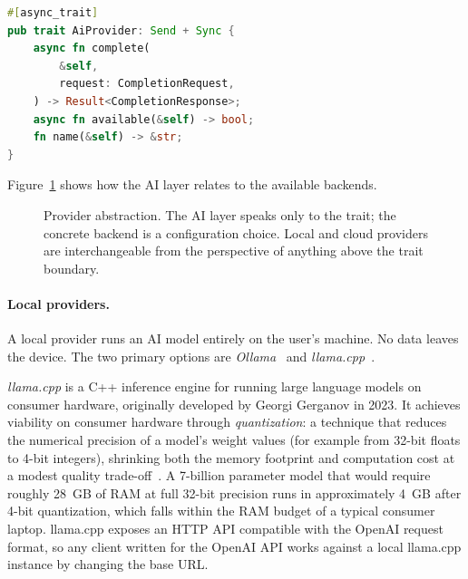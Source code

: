 \begin{lstlisting}[language=Rust, caption={AI provider trait}]
#[async_trait]
pub trait AiProvider: Send + Sync {
    async fn complete(
        &self,
        request: CompletionRequest,
    ) -> Result<CompletionResponse>;
    async fn available(&self) -> bool;
    fn name(&self) -> &str;
}
\end{lstlisting}

Figure~\ref{fig:providers} shows how the AI layer relates to the available
backends.

\begin{figure}[htbp]
\centering
{}
\caption{Provider abstraction. The AI layer speaks only to the trait; the
concrete backend is a configuration choice. Local and cloud providers are
interchangeable from the perspective of anything above the trait boundary.}
\label{fig:providers}
\end{figure}

\paragraph{Local providers.}
A local provider runs an AI model entirely on the user's machine. No data
leaves the device. The two primary options are \emph{Ollama}~\cite{ollama}
and \emph{llama.cpp}~\cite{llamacpp}.

\emph{llama.cpp} is a C++ inference engine for running large language models
on consumer hardware, originally developed by Georgi Gerganov in 2023. It
achieves viability on consumer hardware through \emph{quantization}: a
technique that reduces the numerical precision of a model's weight values
(for example from 32-bit floats to 4-bit integers), shrinking both the memory
footprint and computation cost at a modest quality trade-off~\cite{llamacpp:quant}.
A 7-billion parameter model that would require roughly 28~GB of RAM at full
32-bit precision runs in approximately 4~GB after 4-bit quantization, which
falls within the RAM budget of a typical consumer laptop. llama.cpp exposes
an HTTP API compatible with the OpenAI request format, so any client written
for the OpenAI API works against a local llama.cpp instance by changing the
base URL.

